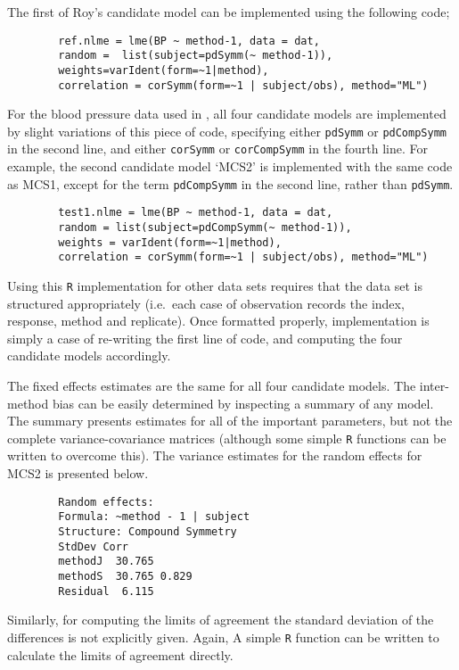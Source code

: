 \documentclass[12pt, a4paper]{report}
\theoremstyle{plain}
\theoremstyle{definition}
\theoremstyle{remark}
\begin{document}
	The first of Roy's candidate model can be implemented using the following code;\\
	
	\begin{framed}
		\begin{verbatim}
		ref.nlme = lme(BP ~ method-1, data = dat,
		random =  list(subject=pdSymm(~ method-1)),
		weights=varIdent(form=~1|method),
		correlation = corSymm(form=~1 | subject/obs), method="ML")
		\end{verbatim}
	\end{framed}
	
	For the blood pressure data used in \citet{ARoy2009}, all four candidate models are implemented by slight variations of this piece of code, specifying either \texttt{pdSymm} or \texttt{pdCompSymm} in the second line, and either \texttt{corSymm} or \texttt{corCompSymm} in the fourth line.
	For example, the second candidate model `MCS2' is implemented with the same code as MCS1, except for the term \texttt{pdCompSymm} in the second line, rather than \texttt{pdSymm}.
	
	\begin{framed}
		\begin{verbatim}
	    test1.nlme = lme(BP ~ method-1, data = dat,
		random = list(subject=pdCompSymm(~ method-1)),
		weights = varIdent(form=~1|method),
		correlation = corSymm(form=~1 | subject/obs), method="ML")
		\end{verbatim}
	\end{framed}
	
	Using this \texttt{R} implementation for other data sets requires that the data set is structured appropriately (i.e.\ each case of observation records the index, response, method and replicate). Once formatted properly, implementation is simply a case of re-writing the first line of code, and computing the four candidate models accordingly.
	
	

	The fixed effects estimates are the same for all four candidate models. The inter-method bias can be easily determined by inspecting a summary of any model. The summary presents estimates for all of the important parameters, but not the complete variance-covariance matrices (although some simple \texttt{R} functions can be written to overcome this). The variance estimates for the random effects for MCS2 is presented below.
	
	\begin{framed}
		\begin{verbatim}
		Random effects:
		Formula: ~method - 1 | subject
		Structure: Compound Symmetry
		StdDev Corr
		methodJ  30.765
		methodS  30.765 0.829
		Residual  6.115
		\end{verbatim}
	\end{framed}
	\vspace{1cm}
	Similarly, for computing the limits of agreement the standard deviation of the differences is not explicitly given. Again, A simple \texttt{R} function can be written to calculate the limits of agreement directly.
	
\end{document}

